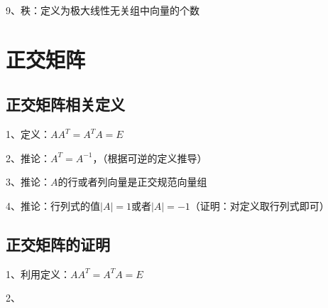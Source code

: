 9、秩：定义为极大线性无关组中向量的个数

\section{正交矩阵}



\subsection{正交矩阵相关定义}

1、定义：$ AA^T=A^TA=E $

2、推论：$ A^T=A^{-1} $，（根据可逆的定义推导）

3、推论：$ A $的行或者列向量是正交规范向量组

4、推论：行列式的值$ |A|=1 $或者$ |A|=-1 $（证明：对定义取行列式即可）



\subsection{正交矩阵的证明}

1、利用定义：$ AA^T=A^TA=E $

2、

